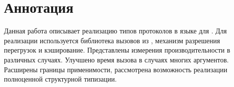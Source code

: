 \section*{Аннотация}
Данная работа описывает реализацию типов протоколов в языке  для . Для реализации используется библиотека вызовов из , механизм разрешения перегрузок и кэширование. Представлены измерения производительности в различных случаях. Улучшено время вызова в случаях многих аргументов. Расширены границы применимости, рассмотрена возможность реализации полноценной структурной типизации. 
